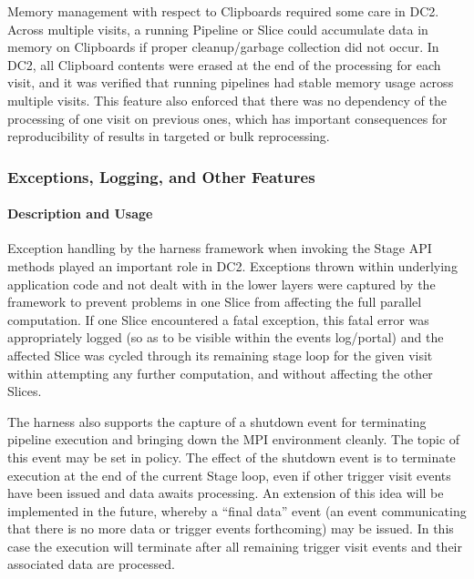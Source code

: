 Memory management with respect to Clipboards required some care in DC2.
Across multiple visits,  a running Pipeline or Slice  could accumulate data in memory on Clipboards
if proper cleanup/garbage collection did not occur.   In DC2, all Clipboard contents were erased at the
end of the processing for each visit, and it was verified  that running pipelines had stable memory usage 
across multiple visits.  This feature also enforced that there was no dependency of the processing
of one visit on previous ones, which has important consequences for reproducibility of results
in targeted or bulk reprocessing. 

\subsubsection{Exceptions, Logging, and Other Features}

\paragraph{Description and Usage}

Exception handling by the harness framework when invoking the Stage API methods
played an important role in DC2.   
Exceptions thrown within underlying application code and not dealt with in
the lower layers were captured by the framework to prevent problems in one Slice from 
affecting the full parallel computation. If one Slice encountered a fatal exception, this fatal error
was appropriately logged (so as to be visible within the events log/portal) and the affected Slice 
was cycled through its remaining stage loop for the given visit within attempting any further 
computation, and without affecting the other Slices.

The harness also supports the capture of a shutdown event for terminating 
pipeline execution and bringing down the MPI environment cleanly.  The
topic of this event may be set in policy.  The effect of the shutdown event 
is to terminate execution at the end of the current Stage loop, even if other trigger 
visit events have been issued and data awaits processing.  An extension of this idea
will be implemented in the future, whereby a ``final data'' event (an event communicating
that  there is no more data or trigger events  forthcoming) may be issued.  In this case
the execution will terminate after all remaining  trigger visit events and their associated 
data are processed.





